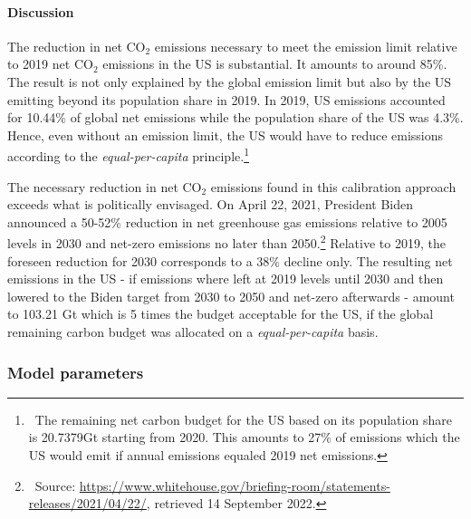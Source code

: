 \paragraph{Discussion}
The reduction in net CO$_2$ emissions necessary to meet the emission limit relative to 2019 net CO$_2$ emissions in the US  is substantial. It amounts to around 85\%. The result is not only explained by the global emission limit but also by the US emitting beyond its population share in 2019. In 2019, US emissions accounted for 10.44\% of global net emissions while the population share of the US was 4.3\%. Hence, even without an emission limit, the US would have to reduce emissions according to the \textit{equal-per-capita} principle.\footnote{\ The remaining net carbon budget for the US based on its population share is 20.7379Gt starting from 2020. This amounts to 27\% of emissions which the US would emit if annual emissions equaled 2019 net emissions.} 

The necessary reduction in net CO$_2$ emissions found in this calibration approach exceeds what is politically envisaged. On April 22, 2021, President Biden announced a 50-52\% reduction in net greenhouse gas emissions relative to 2005 levels in 2030 %
and net-zero emissions no later than 2050.\footnote{\ Source: \href{https://www.whitehouse.gov/briefing-room/statements-releases/2021/04/22/fact-sheet-president-biden-sets-2030-greenhouse-gas-pollution-reduction-target-aimed-at-creating-good-paying-union-jobs-and-securing-u-s-leadership-on-clean-energy-technologies/}{https://www.whitehouse.gov/briefing-room/statements-releases/2021/04/22/}, retrieved 14 September 2022.} 
Relative to 2019, the foreseen reduction for 2030 corresponds to a 38\% decline only.
The resulting net emissions in the US - if emissions where left at 2019 levels until 2030 and then lowered to the Biden target from 2030 to 2050 and net-zero afterwards - amount to 103.21 Gt which is 5 times the budget acceptable for the US,  if the global remaining carbon budget was allocated on a \textit{equal-per-capita} basis. 

\subsubsection{Model parameters}\label{sec:modpar}

